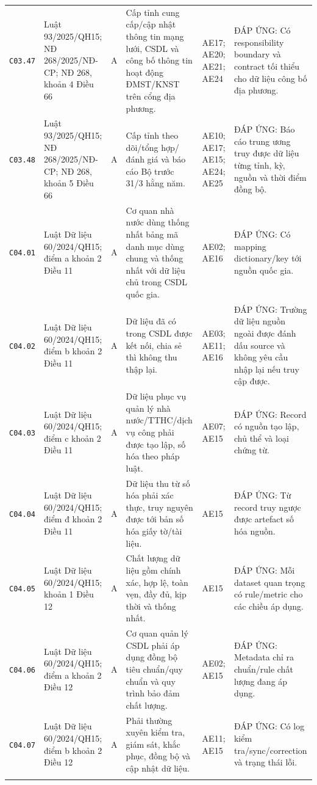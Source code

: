 \begin{longtable}{@{}p{0.9cm}p{3.0cm}p{0.55cm}p{4.05cm}p{2.0cm}p{3.45cm}@{}}
\texttt{C03.47} & Luật 93/2025/QH15; NĐ 268/2025/NĐ-CP; NĐ 268, khoản 4 Điều 66 & A & Cấp tỉnh cung cấp/cập nhật thông tin mạng lưới, CSDL và công bố thông tin hoạt động ĐMST/KNST trên cổng địa phương. & AE17; AE20; AE21; AE24 & ĐÁP ỨNG: Có responsibility boundary và contract tối thiểu cho dữ liệu công bố địa phương. \\ \addlinespace[1pt]
\texttt{C03.48} & Luật 93/2025/QH15; NĐ 268/2025/NĐ-CP; NĐ 268, khoản 5 Điều 66 & A & Cấp tỉnh theo dõi/tổng hợp/đánh giá và báo cáo Bộ trước 31/3 hằng năm. & AE10; AE17; AE15; AE24; AE25 & ĐÁP ỨNG: Báo cáo trung ương truy được dữ liệu từng tỉnh, kỳ, nguồn và thời điểm đồng bộ. \\ \addlinespace[1pt]
\texttt{C04.01} & Luật Dữ liệu 60/2024/QH15; điểm a khoản 2 Điều 11 & A & Cơ quan nhà nước dùng thống nhất bảng mã danh mục dùng chung và thống nhất với dữ liệu chủ trong CSDL quốc gia. & AE02; AE16 & ĐÁP ỨNG: Có mapping dictionary/key tới nguồn quốc gia. \\ \addlinespace[1pt]
\texttt{C04.02} & Luật Dữ liệu 60/2024/QH15; điểm b khoản 2 Điều 11 & A & Dữ liệu đã có trong CSDL được kết nối, chia sẻ thì không thu thập lại. & AE03; AE11; AE16 & ĐÁP ỨNG: Trường dữ liệu nguồn ngoài được đánh dấu source và không yêu cầu nhập lại nếu truy cập được. \\ \addlinespace[1pt]
\texttt{C04.03} & Luật Dữ liệu 60/2024/QH15; điểm c khoản 2 Điều 11 & A & Dữ liệu phục vụ quản lý nhà nước/TTHC/dịch vụ công phải được tạo lập, số hóa theo pháp luật. & AE07; AE15 & ĐÁP ỨNG: Record có nguồn tạo lập, chủ thể và loại chứng từ. \\ \addlinespace[1pt]
\texttt{C04.04} & Luật Dữ liệu 60/2024/QH15; điểm đ khoản 2 Điều 11 & A & Dữ liệu thu từ số hóa phải xác thực, truy nguyên được tới bản số hóa giấy tờ/tài liệu. & AE15 & ĐÁP ỨNG: Từ record truy ngược được artefact số hóa nguồn. \\ \addlinespace[1pt]
\texttt{C04.05} & Luật Dữ liệu 60/2024/QH15; khoản 1 Điều 12 & A & Chất lượng dữ liệu gồm chính xác, hợp lệ, toàn vẹn, đầy đủ, kịp thời và thống nhất. & AE15 & ĐÁP ỨNG: Mỗi dataset quan trọng có rule/metric cho các chiều áp dụng. \\ \addlinespace[1pt]
\texttt{C04.06} & Luật Dữ liệu 60/2024/QH15; điểm a khoản 2 Điều 12 & A & Cơ quan quản lý CSDL phải áp dụng đồng bộ tiêu chuẩn/quy chuẩn và quy trình bảo đảm chất lượng. & AE02; AE15 & ĐÁP ỨNG: Metadata chỉ ra chuẩn/rule chất lượng đang áp dụng. \\ \addlinespace[1pt]
\texttt{C04.07} & Luật Dữ liệu 60/2024/QH15; điểm b khoản 2 Điều 12 & A & Phải thường xuyên kiểm tra, giám sát, khắc phục, đồng bộ và cập nhật dữ liệu. & AE11; AE15 & ĐÁP ỨNG: Có log kiểm tra/sync/correction và trạng thái lỗi. \\ \addlinespace[1pt]

\end{longtable}
